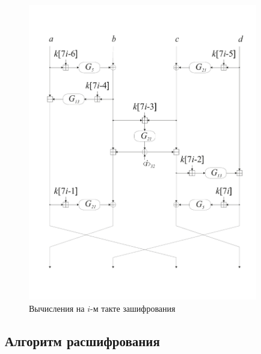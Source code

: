 \begin{figure}[bht]
\begin{center}
\includegraphics[width=10cm]{../figs/belt-round}
\end{center}
\caption{Вычисления на $i$-м такте зашифрования}\label{Figure.BLOCK.Round}
\end{figure}

\subsection{Алгоритм расшифрования}\label{BLOCK.Decr}


